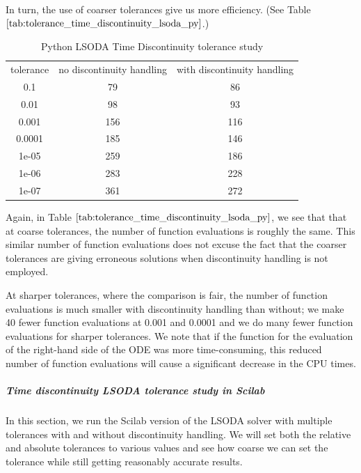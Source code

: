 In turn, the use of coarser tolerances give us more efficiency. (See Table $\ref{tab:tolerance_time_discontinuity_lsoda_py}$.)

\begin{table}[H]
\caption {Python LSODA Time Discontinuity tolerance study} \label{tab:tolerance_time_discontinuity_lsoda_py} 
\begin{center}
\begin{tabular}{ c c c }
tolerance & no discontinuity handling & with discontinuity handling \\ 
0.1 & 79 & 86 \\
0.01 & 98 & 93 \\
0.001 & 156 & 116 \\
0.0001 & 185 & 146 \\
1e-05 & 259 & 186 \\
1e-06 & 283 & 228 \\
1e-07 & 361 & 272 \\
\end{tabular}
\end{center}
\end{table}
Again, in Table $\ref{tab:tolerance_time_discontinuity_lsoda_py}$, we see that that at coarse tolerances, the number of function evaluations is roughly the same. This similar number of function evaluations does not excuse the fact that the coarser tolerances are giving erroneous solutions when discontinuity handling is not employed.

At sharper tolerances, where the comparison is fair, the number of function evaluations is much smaller with discontinuity handling than without; we make 40 fewer function evaluations at 0.001 and 0.0001 and we do many fewer function evaluations for sharper tolerances. We note that if the function for the evaluation of the right-hand side of the ODE was more time-consuming, this reduced number of function evaluations will cause a significant decrease in the CPU times.

\subparagraph{Time discontinuity LSODA tolerance study in Scilab}
In this section, we run the Scilab version of the LSODA solver with multiple tolerances with and without discontinuity handling. We will set both the relative and absolute tolerances to various values and see how coarse we can set the tolerance while still getting reasonably accurate results.

